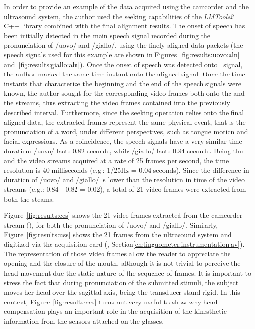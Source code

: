 

In order to provide an example of the data acquired using the camcorder and the
ultrasound system, the author used the seeking capabilities of the 
\emph{LMTools2} C++ library combined with the final alignment results.
The onset of speech has been initially detected in the  main 
speech signal recorded during the pronunciation of /uovo/ and /giallo/, using
the finely aligned data packets (the speech signals used for this example are
shown in Figures~\ref{fig:results:uovo:aln} and~\ref{fig:results:giallo:aln}).
Once the onset of speech was detected onto~ signal, the author
marked the same time instant onto the aligned  signal.
Once the time instants that characterize the beginning and the end of the
speech signals were known, the author sought for the corresponding video
frames both onto the  and the  streams, thus
extracting  the video frames contained into the previously described interval.
Furthermore, since the seeking operation relies onto the final aligned data,
the extracted frames represent the same physical event, that is the
pronunciation of a word, under different perspectives, such as tongue motion and
facial expressions.
As a coincidence, the speech signals have a very similar time duration: /uovo/
lasts 0.82 seconds, while /giallo/ lasts 0.84 seconds.
Being the  and the  video streams acquired at a rate 
of 25 frames per second, the time resolution is 40 milliseconds (e.g.: 1/25Hz =
0.04 seconds).
Since the difference in duration of /uovo/ and /giallo/ is lower than the 
resolution in time of the video streams (e.g.: 0.84 - 0.82 = 0.02), a
total of 21 video frames were extracted from both the steams.

Figure~\ref{fig:results:ccs} shows the 21
video frames extracted from the camcorder stream (), for both the
pronunciation of /uovo/ and /giallo/.
Similarly, Figure~\ref{fig:results:uss}
shows the 21 frames from the ultrasound system and digitized via the acquisition
card (, Section\ref{ch:linguometer:instrumentation:av}).
The representation of those video frames allow the reader to appreciate the
opening and the closure of the mouth, although it is not trivial to perceive
the head movement due the static nature of the sequence of frames.
It is important to stress the fact that during pronunciation of the submitted
stimuli, the subject moves her head over the sagittal axis, being the transducer
stand rigid. 
In this context, Figure~\ref{fig:results:ccs} turns out very useful to show 
why head compensation plays an important role in the acquisition of the 
kinesthetic information from the sensors attached on the glasses.
